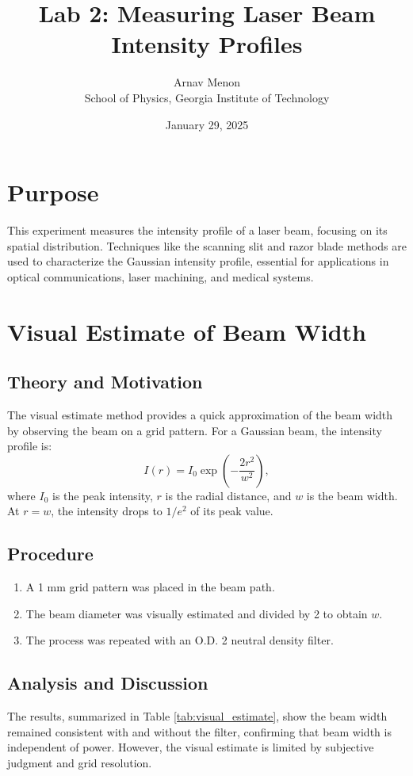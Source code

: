 \documentclass[12pt]{article}
\title{Lab 2: Measuring Laser Beam Intensity Profiles}
\author{Arnav Menon \\ School of Physics, Georgia Institute of Technology}
\date{January 29, 2025}
\begin{document}
\maketitle

\section*{Purpose}
This experiment measures the intensity profile of a laser beam, focusing on its spatial distribution. Techniques like the scanning slit and razor blade methods are used to characterize the Gaussian intensity profile, essential for applications in optical communications, laser machining, and medical systems.

\section{Visual Estimate of Beam Width}

\subsection{Theory and Motivation}
The visual estimate method provides a quick approximation of the beam width by observing the beam on a grid pattern. For a Gaussian beam, the intensity profile is:
\[
I(r) = I_0 \exp\left(-\frac{2r^2}{w^2}\right),
\]
where \( I_0 \) is the peak intensity, \( r \) is the radial distance, and \( w \) is the beam width. At \( r = w \), the intensity drops to \( 1/e^2 \) of its peak value.

\subsection{Procedure}
\begin{enumerate}
    \item A 1 mm grid pattern was placed in the beam path.
    \item The beam diameter was visually estimated and divided by 2 to obtain \( w \).
    \item The process was repeated with an O.D. 2 neutral density filter.
\end{enumerate}

\subsection{Analysis and Discussion}
The results, summarized in Table \ref{tab:visual_estimate}, show the beam width remained consistent with and without the filter, confirming that beam width is independent of power. However, the visual estimate is limited by subjective judgment and grid resolution.
\end{document}
